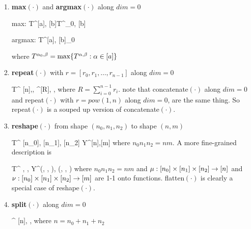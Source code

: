 \begin{enumerate}
\beq
S^{\alp, \nu_1, \nu_2}
\rarrow
Y^{\beta, \nu_1, \nu_2}=S^{\beta(\alp, \nu_1, \nu_2),
\nu_1, \nu_2}
\eeq

\beq
I^{\alp, \nu_1, \nu_2}=
\beta(\alp, \nu_1, \nu_2)
\eeq

{\tt source=} $S^{[a], [n_1], [n_2]}$,
{\tt index=} $I^{[a], [n_1], [n_2]}$

\item {\bf max$(\cdot)$} and {\bf argmax$(\cdot)$} along $dim=0$

\beq
{\rm max:}\;\; T^{[a], [b]}\rarrow T^{\alp_0, [b]}
\eeq

\beq
{\rm argmax:}\;\; T^{[a], [b]}\rarrow \alp_0
\eeq

where $T^{\alpha_0, \beta}=\max\{T^{\alpha, \beta}: \alpha\in[a]\}$



\item {\bf repeat$(\cdot)$} with $r=[r_0, r_1, \ldots, r_{n-1}]$
along $dim=0$

\beq
T^{
[n],\beta, \gamma}\rarrow
{}^{[R], \beta, \gamma}
\eeq
where $R=\sum_{i=0}^{n-1}r_i$.
note that concatenate$(\cdot)$ along $dim=0$ and repeat$(\cdot)$
 with $r=pow(1, n)$
along $dim=0$, are the same thing. So repeat$(\cdot)$ is a
souped up version of concatenate$(\cdot)$.


\item {\bf reshape$(\cdot)$} from shape
$(n_0, n_1, n_2)$ to shape $(n,m)$

\beq
T^{
[n_0],
[n_1],
[n_2]}
\rarrow
Y^{[n],[m]}
\eeq
where
$n_0n_1n_2=nm$. A more fine-grained description is

\beq
T^{
\alpha,
\beta,
\gamma}
\rarrow
Y^{\mu(\alpha, \beta, \gamma),
\nu(\alpha, \beta, \gamma)}
\eeq
where $n_0n_1n_2=nm$ and
$\mu:[n_0]\times[n_1]\times[n_2]\rightarrow [n]$
and
$\nu:[n_0]\times[n_1]\times[n_2]\rightarrow [m]$
are 1-1 onto functions.
flatten$(\cdot)$ is clearly a special case of reshape$(\cdot)$.


\item {\bf split$(\cdot)$} along $dim=0$

\beq
{}^{
[n], \beta, \gamma}
\eeq
where $n= n_0 + n_1 + n_2$





\end{enumerate}
